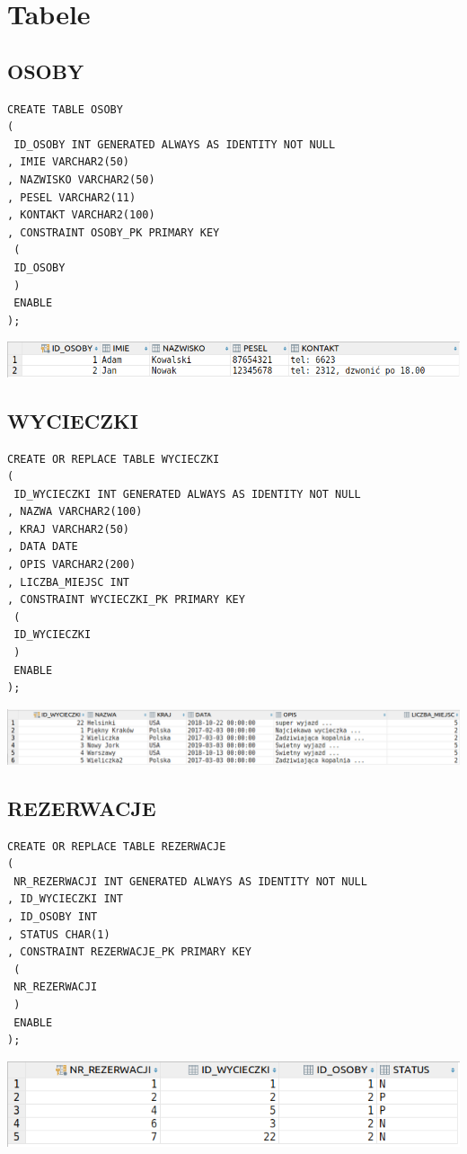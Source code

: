 
\section{Tabele}

\subsection{OSOBY}
\begin{verbatim}
CREATE TABLE OSOBY
(
 ID_OSOBY INT GENERATED ALWAYS AS IDENTITY NOT NULL
, IMIE VARCHAR2(50)
, NAZWISKO VARCHAR2(50)
, PESEL VARCHAR2(11)
, KONTAKT VARCHAR2(100)
, CONSTRAINT OSOBY_PK PRIMARY KEY
 (
 ID_OSOBY
 )
 ENABLE
);
\end{verbatim}

\includegraphics[width=\linewidth]{./images/osoby.png}

\subsection{WYCIECZKI}
\begin{verbatim}
CREATE OR REPLACE TABLE WYCIECZKI
(
 ID_WYCIECZKI INT GENERATED ALWAYS AS IDENTITY NOT NULL
, NAZWA VARCHAR2(100)
, KRAJ VARCHAR2(50)
, DATA DATE
, OPIS VARCHAR2(200)
, LICZBA_MIEJSC INT
, CONSTRAINT WYCIECZKI_PK PRIMARY KEY
 (
 ID_WYCIECZKI
 )
 ENABLE
);
\end{verbatim}


\includegraphics[width=\linewidth]{./images/wycieczki.png}

\subsection{REZERWACJE}
\begin{verbatim}
CREATE OR REPLACE TABLE REZERWACJE
(
 NR_REZERWACJI INT GENERATED ALWAYS AS IDENTITY NOT NULL
, ID_WYCIECZKI INT
, ID_OSOBY INT
, STATUS CHAR(1)
, CONSTRAINT REZERWACJE_PK PRIMARY KEY
 (
 NR_REZERWACJI
 )
 ENABLE
);
\end{verbatim}

\includegraphics[width=\linewidth]{./images/przyszle_rezerwacje_osoby_rezerwacje.png}
